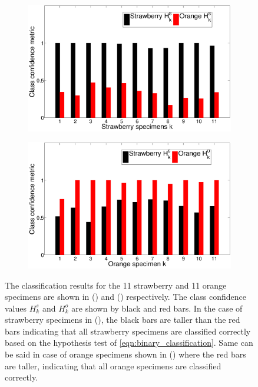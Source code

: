\documentclass {udthesis}
\begin{document}
%
\begin{figure}
  \centering
  \begin{subfigure}[]{0.7\textwidth}
      \includegraphics[width=\textwidth]{classification_metric_strawberry}
      \caption{}
      \label{fig:results_strawberry}
  \end{subfigure}
  \vskip -2pt
  \begin{subfigure}[]{0.7\textwidth}
      \includegraphics[width=\textwidth]{classification_metric_orange}
      \caption{}
      \label{fig:results_orange}
  \end{subfigure}
\caption[Classification results]{The classification results for the 11 strawberry and 11 orange specimens are shown in () and () respectively. The class confidence values $H^s_k$ and $H^o_k$ are shown by black and red bars. In the case of strawberry specimens in (), the black bars are taller than the red bars indicating that all strawberry specimens are classified correctly based on the hypothesis test of \eqref{eqn:binary_classification}. Same can be said in case of orange specimens shown in () where the red bars are taller, indicating that all orange specimens are classified correctly.}
\label{fig:results}
\end{figure}	
%
\end{document}
